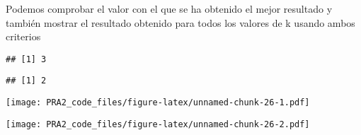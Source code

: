 \documentclass[
]{article}
\newenvironment{Shaded}{\begin{snugshade}}{\end{snugshade}}
\newcommand{\DataTypeTok}[1]{\textcolor[rgb]{0.13,0.29,0.53}{#1}}
\newcommand{\DecValTok}[1]{\textcolor[rgb]{0.00,0.00,0.81}{#1}}
\newcommand{\KeywordTok}[1]{\textcolor[rgb]{0.13,0.29,0.53}{\textbf{#1}}}
\newcommand{\NormalTok}[1]{#1}
\newcommand{\OperatorTok}[1]{\textcolor[rgb]{0.81,0.36,0.00}{\textbf{#1}}}
\newcommand{\StringTok}[1]{\textcolor[rgb]{0.31,0.60,0.02}{#1}}
\begin{document}
Podemos comprobar el valor con el que se ha obtenido el mejor resultado
y también mostrar el resultado obtenido para todos los valores de k
usando ambos criterios

\begin{Shaded}
\end{Shaded}

\begin{verbatim}
## [1] 3
\end{verbatim}

\begin{Shaded}
\end{Shaded}

\begin{verbatim}
## [1] 2
\end{verbatim}

\begin{Shaded}
\end{Shaded}

\texttt{[image: PRA2\_code\_files/figure-latex/unnamed-chunk-26-1.pdf]}

\begin{Shaded}
\end{Shaded}

\texttt{[image: PRA2\_code\_files/figure-latex/unnamed-chunk-26-2.pdf]}
\end{document}

